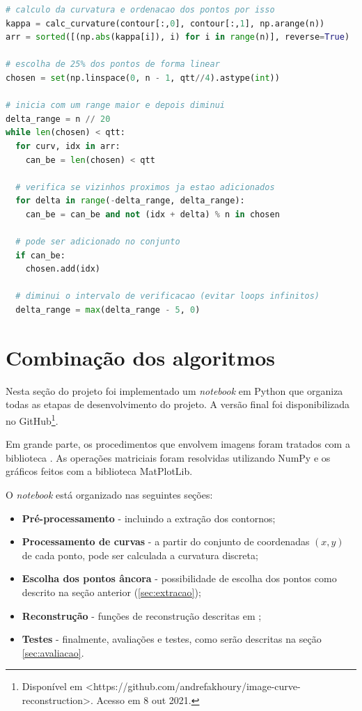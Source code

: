 \begin{lstlisting}[language=Python]
# calculo da curvatura e ordenacao dos pontos por isso
kappa = calc_curvature(contour[:,0], contour[:,1], np.arange(n))
arr = sorted([(np.abs(kappa[i]), i) for i in range(n)], reverse=True)

# escolha de 25% dos pontos de forma linear
chosen = set(np.linspace(0, n - 1, qtt//4).astype(int))

# inicia com um range maior e depois diminui
delta_range = n // 20
while len(chosen) < qtt:
  for curv, idx in arr:
    can_be = len(chosen) < qtt

  # verifica se vizinhos proximos ja estao adicionados
  for delta in range(-delta_range, delta_range):
    can_be = can_be and not (idx + delta) % n in chosen

  # pode ser adicionado no conjunto
  if can_be:
    chosen.add(idx)

  # diminui o intervalo de verificacao (evitar loops infinitos)
  delta_range = max(delta_range - 5, 0)
\end{lstlisting}

\section{Combinação dos algoritmos}\label{sec:combinacao}

Nesta seção do projeto foi implementado um \textit{notebook} em Python que organiza todas as etapas de desenvolvimento do projeto. A versão final \cite{Fakhoury2021} foi disponibilizada no GitHub\footnote{Disponível em <https://github.com/andrefakhoury/image-curve-reconstruction>. Acesso em 8 out 2021.}.

Em grande parte, os procedimentos que envolvem imagens foram tratados com a biblioteca . As operações matriciais foram resolvidas utilizando NumPy e os gráficos feitos com a biblioteca MatPlotLib.

O \textit{notebook} está organizado nas seguintes seções:

\begin{itemize}[noitemsep]
\item \textbf{Pré-processamento} - incluindo a extração dos contornos;
\item \textbf{Processamento de curvas} - a partir do conjunto de coordenadas $(x, y)$ de cada ponto, pode ser calculada a curvatura discreta;
\item \textbf{Escolha dos pontos âncora} - possibilidade de escolha dos pontos como descrito na seção anterior (\ref{sec:extracao});
\item \textbf{Reconstrução} - funções de reconstrução descritas em ;
\item \textbf{Testes} - finalmente, avaliações e testes, como serão descritas na seção \ref{sec:avaliacao}.
\end{itemize}

